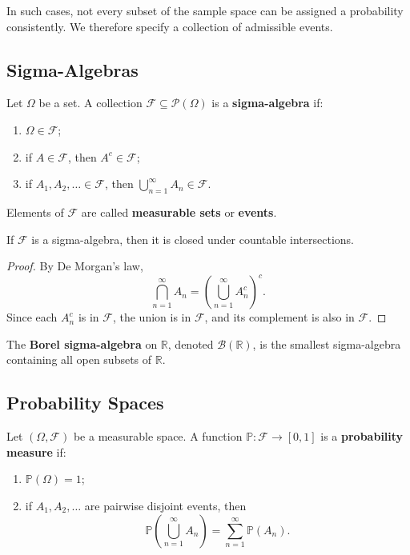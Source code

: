 In such cases, not every subset of the sample space can be assigned a probability consistently. We therefore specify a collection of admissible events.

\subsection{Sigma-Algebras}

\begin{definition}
Let $\Omega$ be a set. A collection $\mathcal{F}\subseteq\mathcal{P}(\Omega)$ is a \textbf{sigma-algebra} if:
\begin{enumerate}
    \item $\Omega\in\mathcal{F}$;
    \item if $A\in\mathcal{F}$, then $A^c\in\mathcal{F}$;
    \item if $A_1,A_2,\dots\in\mathcal{F}$, then $\bigcup_{n=1}^{\infty}A_n\in\mathcal{F}$.
\end{enumerate}
Elements of $\mathcal{F}$ are called \textbf{measurable sets} or \textbf{events}.
\end{definition}

\begin{proposition}
If $\mathcal{F}$ is a sigma-algebra, then it is closed under countable intersections.
\end{proposition}

\begin{proof}
By De Morgan's law,
\[
    \bigcap_{n=1}^{\infty}A_n=\left(\bigcup_{n=1}^{\infty}A_n^c\right)^c.
\]
Since each $A_n^c$ is in $\mathcal{F}$, the union is in $\mathcal{F}$, and its complement is also in $\mathcal{F}$.
\end{proof}

\begin{definition}
The \textbf{Borel sigma-algebra} on $\mathbb{R}$, denoted $\mathcal{B}(\mathbb{R})$, is the smallest sigma-algebra containing all open subsets of $\mathbb{R}$.
\end{definition}

\subsection{Probability Spaces}

\begin{definition}
Let $(\Omega,\mathcal{F})$ be a measurable space. A function $\mathbb{P}:\mathcal{F}\to[0,1]$ is a \textbf{probability measure} if:
\begin{enumerate}
    \item $\mathbb{P}(\Omega)=1$;
    \item if $A_1,A_2,\dots$ are pairwise disjoint events, then
    \[
        \mathbb{P}\left(\bigcup_{n=1}^{\infty}A_n\right)=\sum_{n=1}^{\infty}\mathbb{P}(A_n).
    \]
\end{enumerate}
\end{definition}

